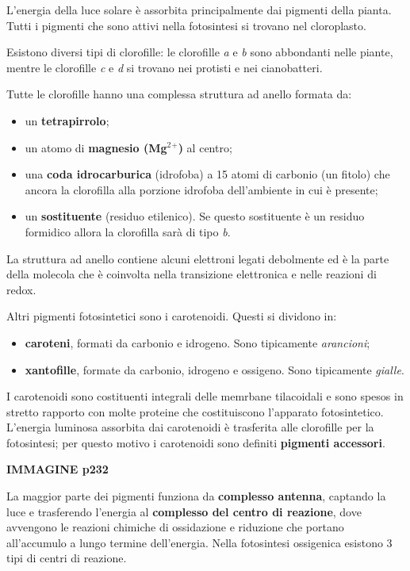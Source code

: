 \documentclass[]{article}
\begin{document}
L'energia della luce solare è assorbita principalmente dai pigmenti
della pianta. Tutti i pigmenti che sono attivi nella fotosintesi si
trovano nel cloroplasto.

Esistono diversi tipi di clorofille: le clorofille \emph{a} e \emph{b}
sono abbondanti nelle piante, mentre le clorofille \emph{c} e \emph{d}
si trovano nei protisti e nei cianobatteri.

Tutte le clorofille hanno una complessa struttura ad anello formata da:

\begin{itemize}
\itemsep1pt\parskip0pt
\item
  un \textbf{tetrapirrolo};
\item
  un atomo di \textbf{magnesio (Mg$^2$$^+$)} al centro;
\item
  una \textbf{coda idrocarburica} (idrofoba) a 15 atomi di carbonio (un
  fitolo) che ancora la clorofilla alla porzione idrofoba dell'ambiente
  in cui è presente;
\item
  un \textbf{sostituente} (residuo etilenico). Se questo sostituente è
  un residuo formidico allora la clorofilla sarà di tipo \emph{b}.
\end{itemize}

La struttura ad anello contiene alcuni elettroni legati debolmente ed è
la parte della molecola che è coinvolta nella transizione elettronica e
nelle reazioni di redox.

Altri pigmenti fotosintetici sono i carotenoidi. Questi si dividono in:

\begin{itemize}
\itemsep1pt\parskip0pt
\item
  \textbf{caroteni}, formati da carbonio e idrogeno. Sono tipicamente
  \emph{arancioni};
\item
  \textbf{xantofille}, formate da carbonio, idrogeno e ossigeno. Sono
  tipicamente \emph{gialle}.
\end{itemize}

I carotenoidi sono costituenti integrali delle memrbane tilacoidali e
sono spesos in stretto rapporto con molte proteine che costituiscono
l'apparato fotosintetico. L'energia luminosa assorbita dai carotenoidi è
trasferita alle clorofille per la fotosintesi; per questo motivo i
carotenoidi sono definiti \textbf{pigmenti accessori}.

\textbf{IMMAGINE p232}

La maggior parte dei pigmenti funziona da \textbf{complesso antenna},
captando la luce e trasferendo l'energia al \textbf{complesso del centro
di reazione}, dove avvengono le reazioni chimiche di ossidazione e
riduzione che portano all'accumulo a lungo termine dell'energia. Nella
fotosintesi ossigenica esistono 3 tipi di centri di reazione.
\end{document}

